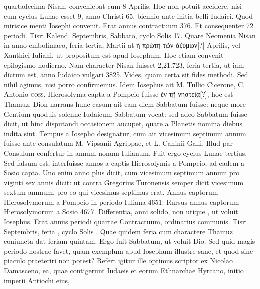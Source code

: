 quartadecima Nisan, conveniebat cum 8 Aprilis.
Hoc non potuit accidere,
nisi cum cyclus Lunae esset 9, anno Christi 65, biennio ante initia
belli Iudaici.
Quod mirisice menti Iosephi convenit.
Erat annus
contractuum 376.
Et consequenter 72 periodi.
Tisri Kalend. %
 Septembris,
Sabbato, cyclo Solis 17.
Quare Neomenia Nisan in anno embolimaeo,
feria tertia, Martii  at \textgreek{ἡ πρώτη τῶν ἀζύμων[?]}
  Aprilis,
vel Xanthici Iuliani, ut propositum est apud Iosephum.
%
Hoc etiam
convenit epilogismo hodierno.
Nam character Nisan fuisset 2,21.723,
feria tertia, ut iam dictum est, anno Iudaico vulgari 3825.
Vides,
quam certa sit fides methodi.
Sed nihil agimus, nisi porro confirmemus.
Idem Iosephus ait M. Tullio Cicerone, C. Antonio \textsc{coss}.
Hierosolyma capta a Pompeio fuisse \textgreek{ἐν τῇ νηστείᾳ[?]},
 hoc est  Thamuz.
Dion narrans hunc casum ait eam diem Sabbatum fuisse:
neque more Gentium quoduis solenne Iudaicum Sabbatum vocat:
sed adeo Sabbatum fuisse dicit, ut hinc disputandi occasionem aucupet,
quare a Planetis nomina diebus indita sint.
Tempus a Iosepho
designatur, cum ait vicesimum septimum annum fuisse ante consulatum
M. Vipsanii Agrippae, et L. Caninii Galli.
Illud par Consulum
confertur in annum nonum Iulianum.
Fuit ergo cyclus Lunae
tertius.
Sed falsum est, interfuisse  annos a captis Hierosolymis
a Pompeio, ad eadem a Sosio capta.
Uno enim anno plus dicit,
cum vicesimum septimum annum pro viginti sex annis dicit: ut contra
Gregorius Turonensis semper dicit vicesimum sextum annnum,
pro eo qui vicesimus septimus erat.
Annus captorum Hierosolymorum
a Pompeio in periodo Iuliana 4651.
Rursus annus captorum
Hierosolymorum a Sosio 4677.
Differentia, anni  solido, non
utique , ut voluit Iosephus.
Erat annus  periodi quartae
Contractuum, ordinarius communis.
Tisri  Septembris, feria
, cyclo Solis .
Quae quidem feria cum charactere Thamuz coniuncta
dat feriam quintam.
Ergo  fuit Sabbatum, ut voluit Dio.
Sed quid
magis periodo nostrae favet, quam exemplum apud Iosephum illustre
sane, et quod sine piaculo praeteriri non potest?
Refert igitur ille optimus
scriptor ex Nicolao Damasceno, ea, quae contigerunt Iudaeis et
eorum Ethnarchae Hyrcano, initio imperii Antiochi eius,
